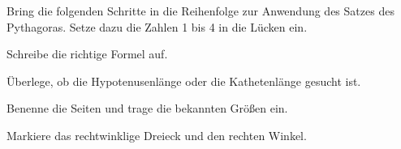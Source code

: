     \begin{minipage}{0.5 \textwidth}
    \end{minipage}%
        \begin{minipage}{0.3 \textwidth}
    \end{minipage}
    
\droptotalpoints

\question[3]
Bring die folgenden Schritte in die Reihenfolge zur Anwendung des Satzes des Pythagoras. Setze dazu die Zahlen 1 bis 4 in die Lücken ein. \hier

\item[\loeslin \textbf{Schritt:}] Schreibe die richtige Formel auf.
\item[\loeslin \textbf{Schritt:}] Überlege, ob die Hypotenusenlänge oder die Kathetenlänge gesucht ist.
\item[\loeslin \textbf{Schritt:}] Benenne die Seiten und trage die bekannten Größen ein.
\item[\loeslin \textbf{Schritt:}] Markiere das rechtwinklige Dreieck und den rechten Winkel.


\droptotalpoints

\question[4]

